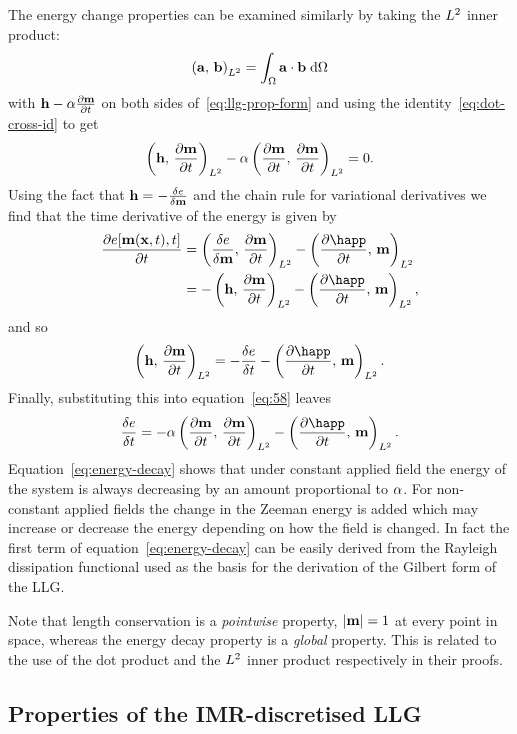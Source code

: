 The energy change properties can be examined similarly by taking the $L^2$ inner product:
\begin{equation}
  \left({\mathbf{a}},\, {\mathbf{b}} \right)_{L^2} = \int_\Omega {\mathbf{a}} \cdot {\mathbf{b}} {\; \text{d}}\Omega
\end{equation}
with $\mathbf{h} - \alpha \frac{\partial \mathbf{m}}{\partial t}$ on both sides of~\eqref{eq:llg-prop-form} and using the identity~\eqref{eq:dot-cross-id} to get
\begin{equation}
  \label{eq:58}
  \left(\mathbf{h},\, \frac{\partial \mathbf{m}}{\partial t} \right)_{L^2} - \alpha \left(\frac{\partial \mathbf{m}}{\partial t},\, \frac{\partial \mathbf{m}}{\partial t} \right)_{L^2} = 0.
\end{equation}
Using the fact that $\mathbf{h} = -\frac{\delta e}{\delta \mathbf{m}}$ and the chain rule for variational derivatives\cite{??ds} we find that the time derivative of the energy is given by
\begin{align*}
  \pd{\e[\mv(\xv, t), t]}{t} &= \ltip{\vd{e}{\mv}}{\dmdt} - \ltip{\pd{\happ}{t}}{\mv} \\
  &= -\ltip{\hv}{\dmdt} - \ltip{\pd{\happ}{t}}{\mv},
\end{align*}
and so
\begin{equation}
  \ltip{\hv}{\dmdt} = -\vd{\e}{t} - \ltip{\pd{\happ}{t}}{\mv}.
\end{equation}
Finally, substituting this into equation~\eqref{eq:58} leaves
\begin{equation}
  \label{eq:energy-decay}
  \vd{\e}{t} = -\dampc \ltip{\dmdt}{\dmdt} - \ltip{\pd{\happ}{t}}{\mv}.
\end{equation}
Equation~\eqref{eq:energy-decay} shows that under constant applied field the energy of the system is always decreasing by an amount proportional to $\alpha$.
For non-constant applied fields the change in the Zeeman energy is added which may increase or decrease the energy depending on how the field is changed. %
In fact the first term of equation~\eqref{eq:energy-decay} can be easily derived from the Rayleigh dissipation functional used as the basis for the derivation of the Gilbert form of the LLG.\cite{Gilbert2004}

Note that length conservation is a \emph{pointwise} property, \ie $\lvert \mathbf{m} \rvert = 1$ at every point in space, whereas the energy decay property is a \emph{global} property.
This is related to the use of the dot product and the $L^2$ inner product respectively in their proofs.


\subsection{Properties of the IMR-discretised LLG}
\label{sec:prop-imr-llg}

